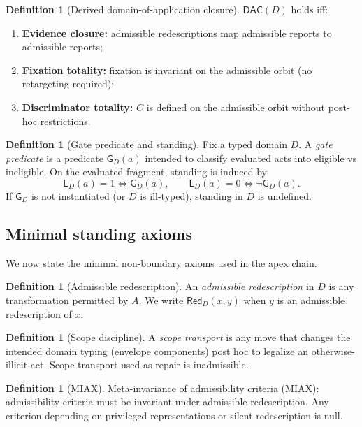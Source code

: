 \documentclass[11pt]{article}
\theoremstyle{definition}
\newtheorem{definition}[theorem]{Definition}
\newcommand{\Red}{\mathsf{Red}}
\newcommand{\DAC}{\mathsf{DAC}}
\newcommand{\Gate}{\mathsf{G}}
\newcommand{\Stand}{\mathsf{L}}
\begin{document}
\begin{definition}[Derived domain-of-application closure]
$\DAC(D)$ holds iff:
\begin{enumerate}[label=(\alph*), leftmargin=2em]
\item \textbf{Evidence closure:} admissible redescriptions map admissible reports to admissible reports;
\item \textbf{Fixation totality:} fixation is invariant on the admissible orbit (no retargeting required);
\item \textbf{Discriminator totality:} $C$ is defined on the admissible orbit without post-hoc restrictions.
\end{enumerate}
\end{definition}

\begin{definition}[Gate predicate and standing]
Fix a typed domain $D$.
A \emph{gate predicate} is a predicate $\Gate_D(a)$ intended to classify evaluated acts into eligible vs ineligible.
On the evaluated fragment, standing is induced by
\[ \Stand_D(a)=1 \iff \Gate_D(a),\qquad \Stand_D(a)=0 \iff \neg \Gate_D(a). \]
If $\Gate_D$ is not instantiated (or $D$ is ill-typed), standing in $D$ is undefined.
\end{definition}

\subsection{Minimal standing axioms}
We now state the minimal non-boundary axioms used in the apex chain.

\begin{definition}[Admissible redescription]
An \emph{admissible redescription} in $D$ is any transformation permitted by $A$.
We write $\Red_D(x,y)$ when $y$ is an admissible redescription of $x$.
\end{definition}

\begin{definition}[Scope discipline]
A \emph{scope transport} is any move that changes the intended domain typing (envelope components) post hoc to legalize an otherwise-illicit act.
Scope transport used as repair is inadmissible.
\end{definition}

\begin{definition}[MIAX]
Meta-invariance of admissibility criteria (MIAX): admissibility criteria must be invariant under admissible redescription. Any criterion depending on privileged representations or silent redescription is null.
\end{definition}
\end{document}
